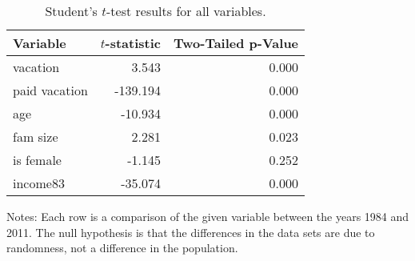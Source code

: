 \documentclass{article}
\begin{document}
    \setlength{\extrarowheight}{3pt}
    \begin{table}[h]
    \centering
    \hspace*{-1.5cm}
    \begin{tabular}{l|r|r}
      Variable      & $t$-statistic & Two-Tailed p-Value \\ \hline \hline
      vacation      &         3.543 &              0.000 \\ \hline
      paid vacation &      -139.194 &              0.000 \\ \hline
      age           &       -10.934 &              0.000 \\ \hline
      fam size      &         2.281 &              0.023 \\ \hline
      is female     &        -1.145 &              0.252 \\ \hline
      income83      &       -35.074 &              0.000
    \end{tabular}
    \hspace*{-1.5cm}
    \caption{Student's $t$-test results for all variables.}
    \label{ttest}
      Notes: Each row is a comparison of the given variable between the years
      1984 and 2011. The null hypothesis is that the differences in the data
      sets are due to randomness, not a difference in the population.
    \end{table}
\end{document}
